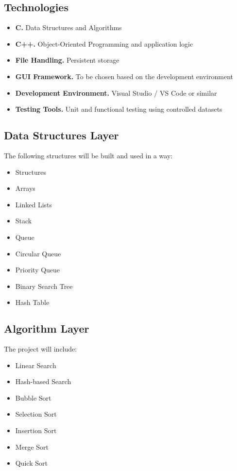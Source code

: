\documentclass[11pt,a4paper]{article}
\begin{document}
\subsection*{Technologies}
\begin{itemize}[leftmargin=1.3em,itemsep=3pt]
    \item \textbf{C.} Data Structures and Algorithms
    \item \textbf{C++.} Object-Oriented Programming and application logic
    \item \textbf{File Handling.} Persistent storage
    \item \textbf{GUI Framework.} To be chosen based on the development environment
    \item \textbf{Development Environment.} Visual Studio / VS Code or similar
    \item \textbf{Testing Tools.} Unit and functional testing using controlled datasets
\end{itemize}

\subsection*{Data Structures Layer}
The following structures will be built and used in a way:
\begin{itemize}[leftmargin=1.3em,itemsep=3pt]
    \item Structures
    \item Arrays
    \item Linked Lists
    \item Stack
    \item Queue
    \item Circular Queue
    \item Priority Queue
    \item Binary Search Tree
    \item Hash Table
\end{itemize}

\subsection*{Algorithm Layer}
The project will include:
\begin{itemize}[leftmargin=1.3em,itemsep=3pt]
    \item Linear Search
    \item Hash-based Search
    \item Bubble Sort
    \item Selection Sort
    \item Insertion Sort
    \item Merge Sort
    \item Quick Sort
\end{itemize}
\end{document}
